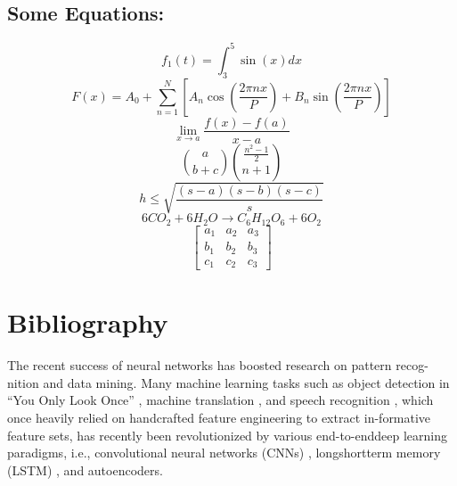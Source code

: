 \documentclass[a4paper]{article}
\begin{document}
\subsection*{Some Equations:}
$$ f_1(t) = \int^5_3 \sin(x) dx $$
$$ 
	F(x) = A_0 + \sum_{n=1}^{N}\left[A_n \cos \left(\frac{2\pi n x }{P} \right) + B_n \sin \left( \frac{2\pi n x }{P} \right) \right]
$$
$$
	\lim_{x\to a} \frac{f(x) -f(a)}{x-a}
$$
$$
	\binom{a}{b+c} \binom{\frac{n^2-1}{2}}{n+1}
$$
$$
	h \leq \sqrt{\frac{(s-a)(s-b)(s-c)}{s}}
$$
$$
	6CO_2 + 6H_2O \to C_6H_12O_6 + 6O_2
$$
\begin{equation}
	\left[
	\begin{matrix}
		a_1 & a_2 & a_3 \\
		b_1 & b_2 & b_3 \\
		c_1 & c_2 & c_3 
	\end{matrix}
	\right]
\end{equation}

\section{Bibliography}
The recent success of neural networks has boosted research 
on pattern recog-nition and data mining.
  Many machine learning tasks such as object detection
  in ``You Only Look Once” \cite{redmon2016you} ,
   machine translation \Cite{luong2015effective},
and speech recognition \Cite{hinton2012deep},
 which once heavily relied on handcrafted feature 
 engineering to extract in-formative feature sets,
  has recently been revolutionized by various 
  end-to-enddeep learning paradigms,
    i.e.,  convolutional neural networks 
	(CNNs) \Cite{lecun1995convolutional},
longshortterm memory (LSTM) \Cite{hochreiter1997long},
 and autoencoders.
\newpage
\printbibliography
\end{document}
